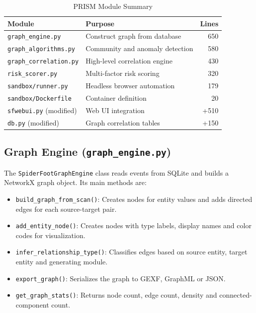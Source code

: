 \documentclass[conference]{IEEEtran}
\begin{document}
\begin{table}[htbp]
\centering
\caption{PRISM Module Summary}
\label{tab:modules}
\begin{tabular}{@{}llr@{}}
\toprule
\textbf{Module} & \textbf{Purpose} & \textbf{Lines} \\
\midrule
\texttt{graph\_engine.py} & Construct graph from database & 650 \\
\texttt{graph\_algorithms.py} & Community and anomaly detection & 580 \\
\texttt{graph\_correlation.py} & High-level correlation engine & 430 \\
\texttt{risk\_scorer.py} & Multi-factor risk scoring & 320 \\
\texttt{sandbox/runner.py} & Headless browser automation & 179 \\
\texttt{sandbox/Dockerfile} & Container definition & 20 \\
\texttt{sfwebui.py} (modified) & Web UI integration & +510 \\
\texttt{db.py} (modified) & Graph correlation tables & +150 \\
\bottomrule
\end{tabular}
\end{table}

\subsection{Graph Engine (\texttt{graph\_engine.py})}

The \texttt{SpiderFootGraphEngine} class reads events from SQLite and builds a NetworkX graph object. Its main methods are:

\begin{itemize}
\item \texttt{build\_graph\_from\_scan()}: Creates nodes for entity values and adds directed edges for each source-target pair.
\item \texttt{add\_entity\_node()}: Creates nodes with type labels, display names and color codes for visualization.
\item \texttt{infer\_relationship\_type()}: Classifies edges based on source entity, target entity and generating module.
\item \texttt{export\_graph()}: Serializes the graph to GEXF, GraphML or JSON.
\item \texttt{get\_graph\_stats()}: Returns node count, edge count, density and connected-component count.
\end{itemize}
\end{document}
